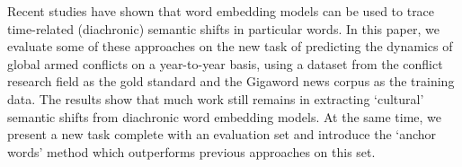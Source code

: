 Recent studies have shown that word embedding models can be used to trace time-related (diachronic) semantic shifts in particular words. In this paper, we evaluate some of these approaches on the new task of predicting the dynamics of global armed conflicts on a year-to-year basis, using a dataset from the conflict research field as the gold standard and the Gigaword news corpus as the training data. The results show that much work still remains in extracting `cultural' semantic shifts from diachronic word embedding models. At the same time, we present a new task complete with an evaluation set and introduce the `anchor words' method which outperforms previous approaches on this set.
